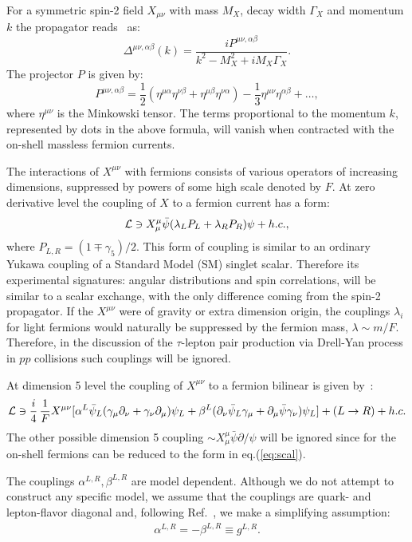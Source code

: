 \documentclass[12pt]{article}
\newcommand\ba{\begin{eqnarray}}
\newcommand\ea{\end{eqnarray}}
\begin{document}
 For a symmetric spin-2 field $X_{\mu\nu}$ with mass $M_X$, decay width $\Gamma_X$  and momentum $k$ the propagator reads~\cite{vDV} as:
 \begin{equation}
 \Delta^{\mu\nu,\alpha\beta}(k)=\frac{iP^{\mu\nu,\alpha\beta}}{k^2-M^2_X+iM_X\Gamma_X}.
 \end{equation}
The  projector $P$ is given by:
 \begin{equation}
 P^{\mu\nu,\alpha\beta}=\frac{1}{2}(\eta^{\mu\alpha}\eta^{\nu\beta}+\eta^{\mu\beta}\eta^{\nu\alpha})- \frac{1}{3}\eta^{\mu\nu}\eta^{\alpha\beta} +\ldots,
 \end{equation}
where $\eta^{\mu\nu}$ is the Minkowski tensor.  
The terms proportional to the momentum $k$, represented by dots in the above formula,  will vanish when contracted with the on-shell massless fermion currents.

The interactions of $X^{\mu\nu}$ with fermions consists of various operators of increasing dimensions, 
suppressed by powers of some high scale denoted by $F$.  At zero derivative level the coupling of $X$ to a fermion current has a form:
\ba
{\cal L} \ni  X^\mu_\mu \bar \psi( \lambda_L P_L +\lambda_R P_R) \psi +h.c., \label{eq:scal}
\ea  
where $P_{L,R}=(1\mp\gamma_5)/2$. 
This form of coupling is similar to an ordinary Yukawa coupling of a Standard Model (SM) singlet scalar.  
Therefore its experimental signatures: angular distributions and spin correlations,  
will be similar to a  scalar exchange, with the only difference coming from the spin-2 propagator.  
If the $X^{\mu\nu}$ were of gravity or extra dimension  origin, 
the couplings $\lambda_i$ for light fermions would naturally be suppressed by the fermion mass, $\lambda\sim m/F$.    
Therefore, in the discussion of the $\tau$-lepton pair production via Drell-Yan process in $pp$ collisions such couplings will be ignored.  

At dimension 5 level the coupling of $X^{\mu\nu}$ to a fermion bilinear is given by~\cite{fermioncoup,GMPU}:
\ba
{\cal L} \ni \frac{i}{4}\,\frac{1}{F} X^{\mu\nu}[\alpha^L\bar \psi_L (\gamma_\mu\partial_\nu+\gamma_\nu\partial_\mu)  \psi_L +\beta^L(\partial_\nu\bar \psi_L \gamma_\mu+\partial_\mu\bar \psi \gamma_\nu) \psi_L ]+(L\to R) +h.c.
\ea
The other possible dimension 5 coupling $\sim X^\mu_\mu \bar\psi \partial\!\!\!\slash \psi$ will be ignored 
since  for the on-shell fermions can be reduced to  the form in eq.(\ref{eq:scal}).

The couplings $\alpha^{L,R},\beta^{L,R}$ are model dependent.  
Although we do not attempt to construct any specific model, we assume that the couplings are quark- and lepton-flavor diagonal and,   
following Ref.~\cite{GMPU}, we make a simplifying assumption:
\ba
\alpha^{L,R}=-\beta^{L,R}\equiv g^{L,R}.
\ea 
\end{document}
